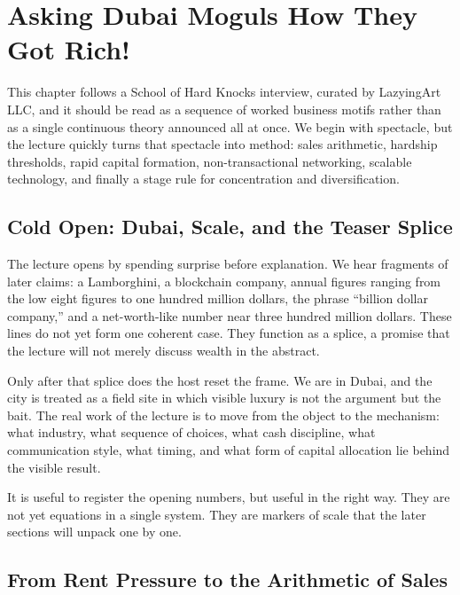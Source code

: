 \chapter{Asking Dubai Moguls How They Got Rich!}

This chapter follows a School of Hard Knocks interview, curated by LazyingArt LLC, and it should be read as a sequence of worked business motifs rather than as a single continuous theory announced all at once. We begin with spectacle, but the lecture quickly turns that spectacle into method: sales arithmetic, hardship thresholds, rapid capital formation, non-transactional networking, scalable technology, and finally a stage rule for concentration and diversification.

\section{Cold Open: Dubai, Scale, and the Teaser Splice}

The lecture opens by spending surprise before explanation. We hear fragments of later claims: a Lamborghini, a blockchain company, annual figures ranging from the low eight figures to one hundred million dollars, the phrase ``billion dollar company,'' and a net-worth-like number near three hundred million dollars. These lines do not yet form one coherent case. They function as a splice, a promise that the lecture will not merely discuss wealth in the abstract.

Only after that splice does the host reset the frame. We are in Dubai, and the city is treated as a field site in which visible luxury is not the argument but the bait. The real work of the lecture is to move from the object to the mechanism: what industry, what sequence of choices, what cash discipline, what communication style, what timing, and what form of capital allocation lie behind the visible result.

It is useful to register the opening numbers, but useful in the right way. They are not yet equations in a single system. They are markers of scale that the later sections will unpack one by one.

\section{From Rent Pressure to the Arithmetic of Sales}

